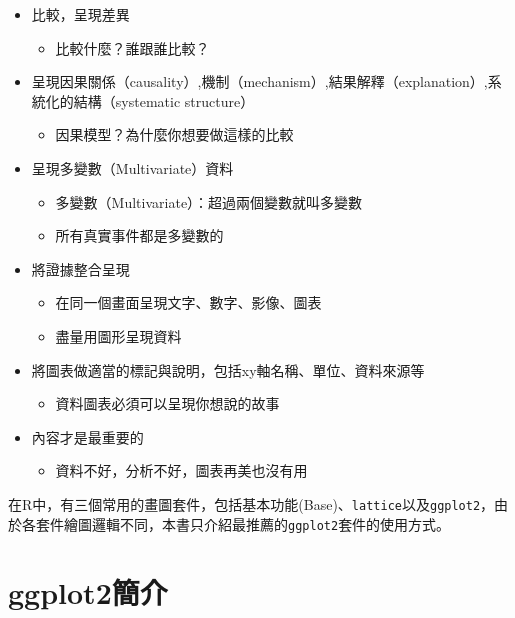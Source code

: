 \documentclass[
]{book}
\providecommand{\tightlist}{%
  \setlength{\itemsep}{0pt}\setlength{\parskip}{0pt}}
\begin{document}
\begin{itemize}
\tightlist
\item
  比較，呈現差異

  \begin{itemize}
  \tightlist
  \item
    比較什麼？誰跟誰比較？
  \end{itemize}
\item
  呈現因果關係（causality）,機制（mechanism）,結果解釋（explanation）,系統化的結構（systematic structure）

  \begin{itemize}
  \tightlist
  \item
    因果模型？為什麼你想要做這樣的比較
  \end{itemize}
\item
  呈現多變數（Multivariate）資料

  \begin{itemize}
  \tightlist
  \item
    多變數（Multivariate）：超過兩個變數就叫多變數
  \item
    所有真實事件都是多變數的
  \end{itemize}
\item
  將證據整合呈現

  \begin{itemize}
  \tightlist
  \item
    在同一個畫面呈現文字、數字、影像、圖表
  \item
    盡量用圖形呈現資料
  \end{itemize}
\item
  將圖表做適當的標記與說明，包括xy軸名稱、單位、資料來源等

  \begin{itemize}
  \tightlist
  \item
    資料圖表必須可以呈現你想說的故事
  \end{itemize}
\item
  內容才是最重要的

  \begin{itemize}
  \tightlist
  \item
    資料不好，分析不好，圖表再美也沒有用
  \end{itemize}
\end{itemize}

在R中，有三個常用的畫圖套件，包括基本功能(Base)、\texttt{lattice}以及\texttt{ggplot2}，由於各套件繪圖邏輯不同，本書只介紹最推薦的\texttt{ggplot2}套件的使用方式。

\hypertarget{ggplot2ux7c21ux4ecb}{%
\section{ggplot2簡介}\label{ggplot2ux7c21ux4ecb}}
\end{document}
